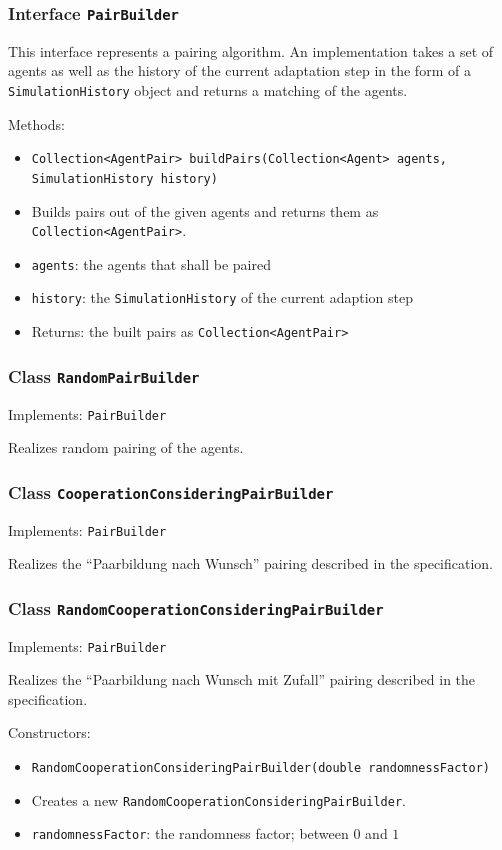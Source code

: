 \documentclass[parskip=full,11pt]{scrartcl}
\begin{document}
\subsubsection{Interface \texttt{PairBuilder}}
This interface represents a pairing algorithm. An implementation takes a set of agents as well as the history of the current adaptation step in the form of a \texttt{SimulationHistory} object and returns a matching of the agents.

Methods:
\begin{itemize}\itemsep -10pt
\item \texttt{Collection<AgentPair> buildPairs(Collection<Agent> agents, SimulationHistory history)}
\item[] Builds pairs out of the given agents and returns them as \texttt{Collection<AgentPair>}.
\item[] \texttt{agents}: the agents that shall be paired
\item[] \texttt{history}: the \texttt{SimulationHistory} of the current adaption step
\item[] Returns: the built pairs as \texttt{Collection<AgentPair>}
\end{itemize}

\subsubsection{Class \texttt{RandomPairBuilder}}
Implements: \texttt{PairBuilder}

Realizes random pairing of the agents.

\subsubsection{Class \texttt{CooperationConsideringPairBuilder}}
Implements: \texttt{PairBuilder}

Realizes the \enquote{Paarbildung nach Wunsch} pairing described in the specification.

\subsubsection{Class \texttt{RandomCooperationConsideringPairBuilder}}
Implements: \texttt{PairBuilder}

Realizes the \enquote{Paarbildung nach Wunsch mit Zufall} pairing described in the specification.


Constructors:
\begin{itemize}\itemsep -10pt
\item \texttt{RandomCooperationConsideringPairBuilder(double randomnessFactor)}
\item[] Creates a new \texttt{RandomCooperationConsideringPairBuilder}.
\item[] \texttt{randomnessFactor}: the randomness factor; between \(0\) and \(1\)
\end{itemize}
\end{document}
